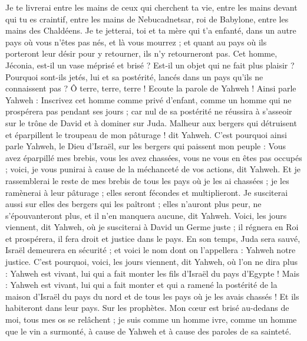 \begin{multicols}{2}
Je te livrerai entre les mains de ceux qui cherchent ta vie, entre les mains devant qui tu es craintif, entre les mains de Nebucadnetsar, roi de Babylone, entre les mains des Chaldéens.
Je te jetterai, toi et ta mère qui t'a enfanté, dans un autre pays où vous n'êtes pas nés, et là vous mourrez ;
et quant au pays où ils porteront leur désir pour y retourner, ils n'y retourneront pas.
Cet homme, Jéconia, est-il un vase méprisé et brisé ? Est-il un objet qui ne fait plus plaisir ? Pourquoi sont-ils jetés, lui et sa postérité, lancés dans un pays qu'ils ne connaissent pas ?
Ô terre, terre, terre ! Ecoute la parole de Yahweh !
Ainsi parle Yahweh : Inscrivez cet homme comme privé d'enfant, comme un homme qui ne prospérera pas pendant ses jours ; car nul de sa postérité ne réussira à s’asseoir sur le trône de David et à dominer sur Juda.
\VerseOne{}Malheur aux bergers qui détruisent et éparpillent le troupeau de mon pâturage ! dit Yahweh.
C'est pourquoi ainsi parle Yahweh, le Dieu d'Israël, sur les bergers qui paissent mon peuple : Vous avez éparpillé mes brebis, vous les avez chassées, vous ne vous en êtes pas occupés ; voici, je vous punirai à cause de la méchanceté de vos actions, dit Yahweh.
Et je rassemblerai le reste de mes brebis de tous les pays où je les ai chassées ; je les ramènerai à leur pâturage ; elles seront fécondes et multiplieront.
Je susciterai aussi sur elles des bergers qui les paîtront ; elles n'auront plus peur, ne s'épouvanteront plus, et il n'en manquera aucune, dit Yahweh.
Voici, les jours viennent, dit Yahweh, où je susciterai à David un Germe juste ; il régnera en Roi et prospérera, il fera droit et justice dans le pays.
En son temps, Juda sera sauvé, Israël demeurera en sécurité ; et voici le nom dont on l'appellera : Yahweh notre justice.
C'est pourquoi, voici, les jours viennent, dit Yahweh, où l’on ne dira plus : Yahweh est vivant, lui qui a fait monter les fils d'Israël du pays d'Egypte !
Mais : Yahweh est vivant, lui qui a fait monter et qui a ramené la postérité de la maison d'Israël du pays du nord et de tous les pays où je les avais chassés ! Et ils habiteront dans leur pays.
Sur les prophètes. Mon cœur est brisé au-dedans de moi, tous mes os se relâchent ; je suis comme un homme ivre, comme un homme que le vin a surmonté, à cause de Yahweh et à cause des paroles de sa sainteté.

\end{multicols}
